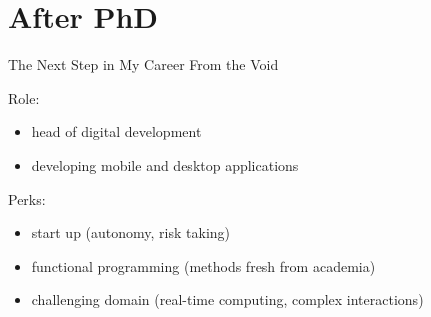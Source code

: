 \documentclass{beamer}
\begin{document}
\section{After PhD}

\begin{frame}{The Next Step in My Career}
  From the Void
  
  Role:
  \begin{itemize}
  \item head of digital development
  \item developing mobile and desktop applications
  \end{itemize}

  Perks:
  \begin{itemize}
  \item start up (autonomy, risk taking)
  \item functional programming (methods fresh from academia)
  \item challenging domain (real-time computing, complex interactions)
  \end{itemize}
\end{frame}
\end{document}
